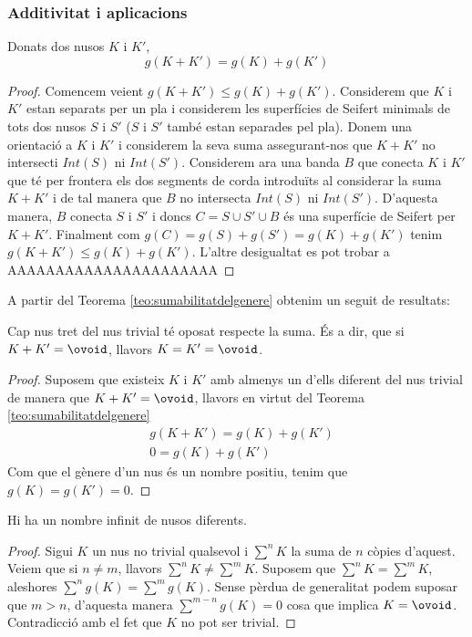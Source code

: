 \subsubsection{Additivitat i aplicacions}

\begin{theorem}\label{teo:sumabilitatdelgenere}
	Donats dos nusos $K$ i $K'$, $$g(K+K')=g(K)+g(K')$$
\end{theorem}

\begin{proof}
	Comencem veient $g(K+K')\leq g(K)+g(K')$. Considerem que $K$ i $K'$ estan separats per un pla i considerem les superfícies de Seifert minimals de tots dos nusos $S$ i $S'$ ($S$ i $S'$ també estan separades pel pla). Donem una orientació a $K$ i $K'$ i considerem la seva suma assegurant-nos que $K+K'$ no intersecti $Int(S)$ ni $Int(S')$. Considerem ara una banda $B$ que conecta $K$ i $K'$ que té per frontera els dos segments de corda introduïts al considerar la suma $K+K'$ i de tal manera que $B$ no intersecta $Int(S)$ ni $Int(S')$. D'aquesta manera, $B$ conecta $S$ i $S'$ i doncs $C=S\cup S'\cup B$ és una superfície de Seifert per $K+K'$. Finalment com $g(C)=g(S)+g(S')=g(K)+g(K')$ tenim $g(K+K')\leq g(K)+g(K')$. L'altre desigualtat es pot trobar a AAAAAAAAAAAAAAAAAAAAAA
\end{proof}

A partir del Teorema \ref{teo:sumabilitatdelgenere} obtenim un seguit de resultats:

\begin{corolary}
	Cap nus tret del nus trivial té oposat respecte la suma. És a dir, que si $K+K'=\ovoid$, llavors $K=K'=\ovoid$.
\end{corolary}

\begin{proof}
	Suposem que existeix $K$ i $K'$ amb almenys un d'ells diferent del nus trivial de manera que $K+K'=\ovoid$, llavors en virtut del Teorema \ref{teo:sumabilitatdelgenere}
	\begin{align*}
		&g(K+K')=g(K)+g(K')\\
		&0=g(K)+g(K')
	\end{align*}
	Com que el gènere d'un nus és un nombre positiu, tenim que $g(K)=g(K')=0$.
\end{proof}

\begin{corolary}
	Hi ha un nombre infinit de nusos diferents.
\end{corolary}

\begin{proof}
	Sigui $K$ un nus no trivial qualsevol i $\sum^{n}K$ la suma de $n$ còpies d'aquest. Veiem que si $n\neq m$, llavors $\sum^{n}K\neq\sum^{m}K$. Suposem que $\sum^{n}K=\sum^{m}K$, aleshores $\sum^{n}g(K)=\sum^{m}g(K)$. Sense pèrdua de generalitat podem suposar que $m>n$, d'aquesta manera $\sum^{m-n}g(K)=0$ cosa que implica $K=\ovoid$. Contradicció amb el fet que $K$ no pot ser trivial.
\end{proof}

